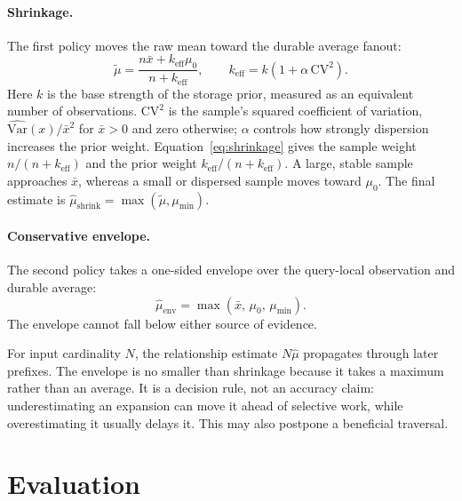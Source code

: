 \documentclass[sigconf]{cidr-2027}
\begin{document}
\paragraph{Shrinkage.}
The first policy moves the raw mean toward the durable average fanout:
\begin{equation}
  \widetilde{\mu} =
  \frac{n\bar{x} + k_{\mathrm{eff}}\mu_0}
       {n+k_{\mathrm{eff}}},
  \qquad
  k_{\mathrm{eff}} = k(1+\alpha\,\mathrm{CV}^2).
  \label{eq:shrinkage}
\end{equation}
Here $k$ is the base strength of the storage prior, measured as an equivalent
number of observations. $\mathrm{CV}^2$ is the sample's squared coefficient of
variation, $\widehat{\mathrm{Var}}(x)/\bar{x}^2$ for $\bar{x}>0$ and zero
otherwise; $\alpha$ controls how strongly dispersion increases the prior
weight. Equation~\ref{eq:shrinkage} gives the sample weight
$n/(n+k_{\mathrm{eff}})$ and the prior weight
$k_{\mathrm{eff}}/(n+k_{\mathrm{eff}})$. A large, stable sample approaches
$\bar{x}$, whereas a small or dispersed sample moves toward $\mu_0$. The
final estimate is
$\widehat{\mu}_{\mathrm{shrink}}=\max(\widetilde{\mu},\mu_{\min})$.

\paragraph{Conservative envelope.}
The second policy takes a one-sided envelope over the query-local
observation and durable average:
\begin{equation}
  \widehat{\mu}_{\mathrm{env}} =
  \max\!\left(\bar{x},\,\mu_0,\,\mu_{\min}\right).
  \label{eq:envelope}
\end{equation}
The envelope cannot fall below either source of evidence.

For input cardinality $N$, the relationship estimate $N\widehat{\mu}$
propagates through later prefixes.
The envelope is no smaller than shrinkage because it takes a maximum rather
than an average. It is a decision rule, not an accuracy claim: underestimating
an expansion can move it ahead of selective work, while overestimating it
usually delays it. This may also postpone a beneficial traversal.

\section{Evaluation}
\label{sec:evaluation}
\end{document}
